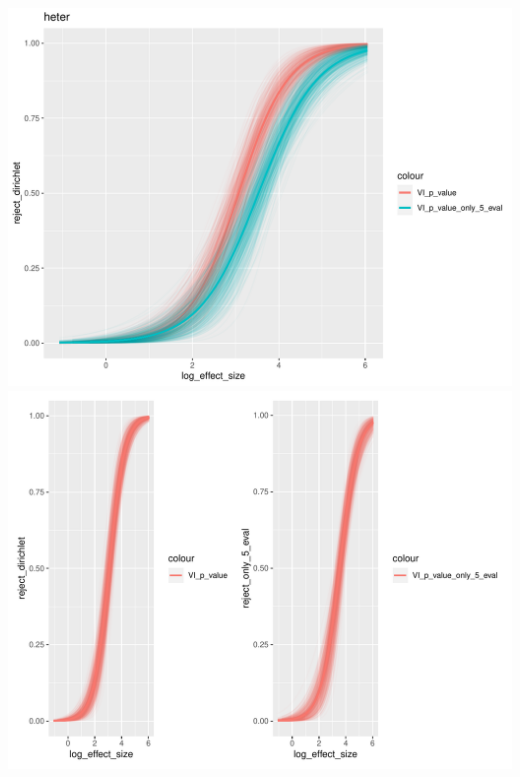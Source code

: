 \documentclass[]{interact}
\theoremstyle{plain}%
\theoremstyle{definition}
\theoremstyle{remark}
\begin{document}
\includegraphics[width=1\linewidth]{paper_comparison_files/figure-latex/unnamed-chunk-13-1}
\includegraphics[width=1\linewidth]{paper_comparison_files/figure-latex/unnamed-chunk-13-2}
\end{document}
